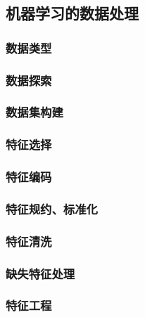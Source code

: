 \subsection{机器学习的数据处理}
\subsubsection{数据类型}
\subsubsection{数据探索}
\subsubsection{数据集构建}
\subsubsection{特征选择}
\subsubsection{特征编码}
\subsubsection{特征规约、标准化}
\subsubsection{特征清洗}
\subsubsection{缺失特征处理}
\subsubsection{特征工程}

